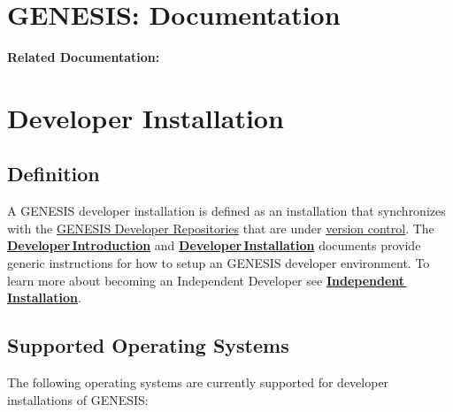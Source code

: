 \documentclass[12pt]{article}
\begin{document}
\section*{GENESIS: Documentation}

{\bf Related Documentation:} \\

\section*{Developer Installation}

\subsection*{Definition}


A GENESIS developer installation is defined as an installation that
synchronizes with the
\href{../developer-repository/developer-repository.tex}{GENESIS
  Developer Repositories} that are under
\href{../version-control/version-control.tex}{version control}.
The~\href{../developer-intro/developer-intro.tex}{\bf
  Developer\,Introduction} and
\href{../installation-developer/installation-developer.tex}{\bf
  Developer\,Installation} documents provide generic instructions for
how to setup an GENESIS developer environment.  To learn more about
becoming an Independent Developer see
\href{../installation-independent/installation-independent.tex}{\bf
  Independent\,Installation}.

\subsection*{Supported Operating Systems}

The following operating systems are currently supported for developer installations of GENESIS:
\end{document}
